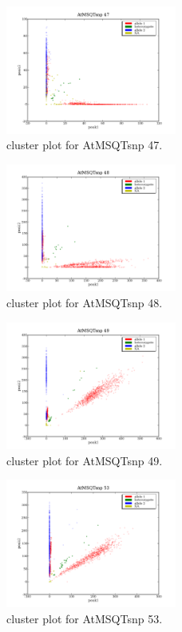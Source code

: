 \begin{figure}[H]
\includegraphics[width=0.5\textwidth]{figures/cluster_plot_AtMSQTsnp_47.png}
\caption{cluster plot for AtMSQTsnp 47.} \label{flAtMSQTsnp47}
\end{figure}
\begin{figure}[H]
\includegraphics[width=0.5\textwidth]{figures/cluster_plot_AtMSQTsnp_48.png}
\caption{cluster plot for AtMSQTsnp 48.} \label{flAtMSQTsnp48}
\end{figure}
\begin{figure}[H]
\includegraphics[width=0.5\textwidth]{figures/cluster_plot_AtMSQTsnp_49.png}
\caption{cluster plot for AtMSQTsnp 49.} \label{flAtMSQTsnp49}
\end{figure}
\begin{figure}[H]
\includegraphics[width=0.5\textwidth]{figures/cluster_plot_AtMSQTsnp_53.png}
\caption{cluster plot for AtMSQTsnp 53.} \label{flAtMSQTsnp53}
\end{figure}
